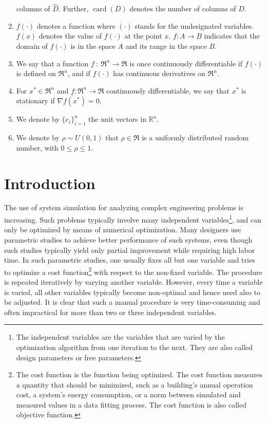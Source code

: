 \begin{enumerate}
columns of $\widehat D$. Further, $\operatorname{card}(D)$ denotes the number
of columns of $D$.
\item
$f(\cdot)$ denotes a function where $(\cdot)$ stands for the undesignated variables. $f(x)$ denotes the value of $f(\cdot)$ at the point $x$. $f\colon A \rightarrow B$ indicates that the domain of $f(\cdot)$ is in the space $A$ and its range in the space $B$.
\item 
We say that a function $f \ \colon \ \Re^n \to \Re$ is once continuously differentiable
if $f(\cdot)$ is defined on $\Re^n$,
and if $f(\cdot)$ has continuous derivatives on $\Re^n$.
\item
For $x^* \in \Re^n$ and $f \colon \Re^n \to \Re$ continuously differentiable, 
we say that $x^*$ is stationary if $\nabla f(x^*) = 0$.
\item
We denote by $\{ e_i \}_{i=1}^n$ the unit vectors in $\mathbb R^n$.
\item
We denote by $\rho \sim U(0,1)$ that $\rho \in \Re$ 
is a uniformly distributed random number, with $0 \le \rho \le 1$.
\end{enumerate}

\chapter{Introduction}
The use of system simulation for analyzing complex engineering problems is increasing.
Such problems typically involve many independent variables\footnote{The independent 
variables are the variables that are varied by the optimization algorithm
from one iteration to the next.
They are also called design parameters or free parameters.},
and can only be optimized by
means of numerical optimization.
Many designers use parametric studies to achieve better performance 
of such systems, 
even though such studies typically yield only partial improvement while requiring 
high labor time.
In such parametric studies, one usually fixes all but one variable 
and tries to optimize a cost function\footnote{The cost function is the function being optimized.
The cost function measures a quantity that should be minimized, such as
a building's annual operation cost,
a system's energy consumption, or
a norm between simulated and measured values in a data fitting process.
The cost function is also called objective function.}
with respect to the non-fixed variable.
The procedure is repeated iteratively by varying another variable.
However, every time a variable is varied, all other variables typically become non-optimal and hence need also to be adjusted.
It is clear that such a manual procedure is very time-consuming and often impractical for more than two or three independent variables.\\


